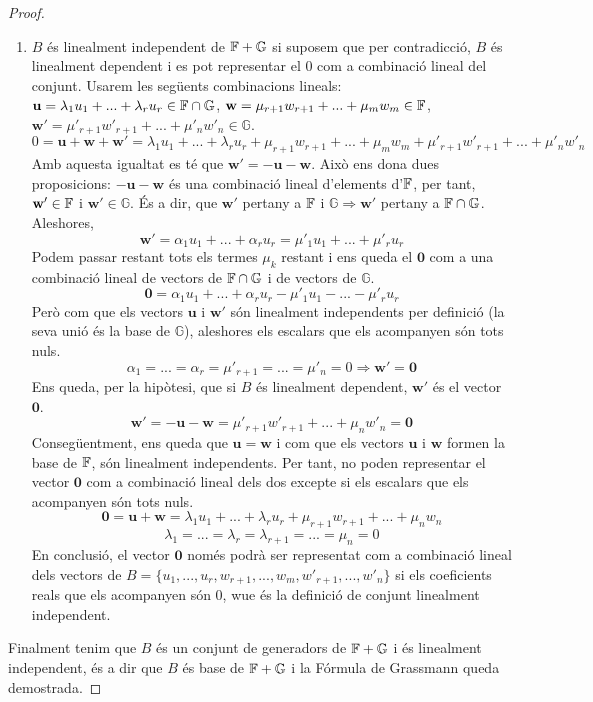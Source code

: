 \begin{proof}
\begin{enumerate}[(1)]
\item $B$ és linealment independent de $\mathbb{F}+\mathbb{G}$ si suposem que per contradicció, $B$ és linealment dependent i es pot representar el $0$ com a combinació lineal del conjunt. Usarem les següents combinacions lineals: $\mathbf{u} = \lambda_1 u_1 + ... + \lambda_r u_r \in \mathbb{F}\cap\mathbb{G}$, $\mathbf{w} = \mu_{r+1} w_{r+1} + ... + \mu_m w_m \in \mathbb{F}$, $\mathbf{w'} = \mu'_{r+1} w'_{r+1} + ... + \mu'_n w'_n \in \mathbb{G}$.
\[
0 = \mathbf{u} + \mathbf{w} + \mathbf{w'} = \lambda_1 u_1 + ... + \lambda_r u_r + \mu_{r+1} w_{r+1} + ... + \mu_m w_m + \mu'_{r+1} w'_{r+1} + ... + \mu'_n w'_n
\]
Amb aquesta igualtat es té que $\mathbf{w'} = -\mathbf{u} -\mathbf{w}$. Això ens dona dues proposicions: $-\mathbf{u} -\mathbf{w}$ és una combinació lineal d'elements d'$\mathbb{F}$, per tant, $\mathbf{w'} \in \mathbb{F}$ i $\mathbf{w'} \in \mathbb{G}$. És a dir, que $\mathbf{w'}$ pertany a $\mathbb{F}$ i $\mathbb{G}\Rightarrow \mathbf{w'}$ pertany a $\mathbb{F}\cap\mathbb{G}$. Aleshores,
\[ \mathbf{w'} = \alpha_1 u_1 + ... + \alpha_r u_r = \mu'_1 u_1 + ... + \mu'_r u_r \]
Podem passar restant tots els termes $\mu_k$ restant i ens queda el $\mathbf{0}$ com a una combinació lineal de vectors de $\mathbb{F}\cap\mathbb{G}$ i de vectors de $\mathbb{G}$.
\[ \mathbf{0} = \alpha_1 u_1 + ... + \alpha_r u_r - \mu'_1 u_1 - ... - \mu'_r u_r \]
Però com que els vectors $\mathbf{u}$ i $\mathbf{w'}$ són linealment independents per definició (la seva unió és la base de $\mathbb{G}$), aleshores els escalars que els acompanyen són tots nuls.
\[ \alpha_1 = ... = \alpha_r = \mu'_{r+1} = ... = \mu'_{n} = 0 \Rightarrow \mathbf{w'} = \mathbf{0}\]
Ens queda, per la hipòtesi, que si $B$ és linealment dependent, $\mathbf{w'}$ és el vector $\mathbf{0}$.
\[
\mathbf{w'} = -\mathbf{u} - \mathbf{w} = \mu'_{r+1} w'_{r+1} + ... + \mu_n w'_n = \mathbf{0}
\]
Consegüentment, ens queda que $\mathbf{u} = \mathbf{w}$ i com que els vectors $\mathbf{u}$ i $\mathbf{w}$ formen la base de $\mathbb{F}$, són linealment independents. Per tant, no poden representar el vector $\mathbf{0}$ com a combinació lineal dels dos excepte si els escalars que els acompanyen són tots nuls.
\[\mathbf{0} = \mathbf{u} + \mathbf{w} = \lambda_1 u_1 + ... + \lambda_r u_r + \mu_{r+1} w_{r+1} + ... + \mu_n w_n\]
\[ \lambda_1 = ... = \lambda_r = \lambda_{r+1} = ... = \mu_n = 0 \]
En conclusió, el vector $\mathbf{0}$ només podrà ser representat com a combinació lineal dels vectors de $B = \{u_1,...,u_r, w_{r+1}, ..., w_m, w'_{r+1},...,w'_n\}$ si els coeficients reals que els acompanyen són $0$, wue és la definició de conjunt linealment independent.
\end{enumerate}

Finalment tenim que $B$ és un conjunt de generadors de $\mathbb{F}+\mathbb{G}$ i és linealment independent, és a dir que $B$ és base de $\mathbb{F}+\mathbb{G}$ i la Fórmula de Grassmann queda demostrada. 
\end{proof}

